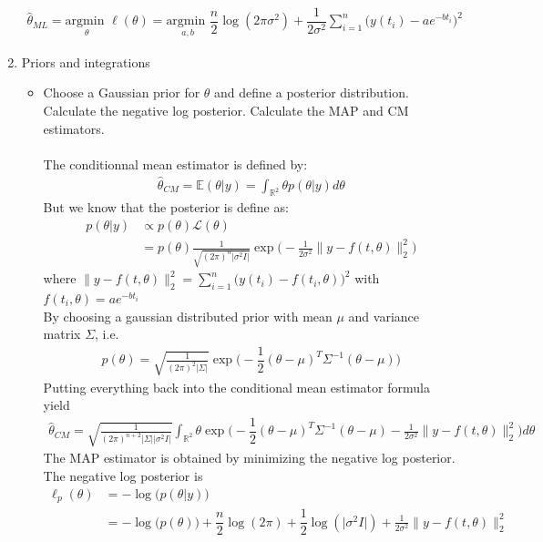 \documentclass[11pt,a4paper]{article}
\newcommand{\R}{\mathbb{R}}
\begin{document}
\begin{enumerate}
\begin{align*}
	\boxed{\hat{\theta}_{ML} = \underset{\theta}{\text{argmin }}\ell(\theta)=\underset{a,b}{\text{argmin }}\dfrac{n}{2}\log(2\pi\sigma^{2}) + \dfrac{1}{2\sigma^{2}}\sum_{i=1}^{n}\big(y(t_i)-ae^{-bt_i}\big)^{2}}
\end{align*}
\item Priors and integrations
\begin{itemize}
	\item Choose a Gaussian prior for $ \theta $ and define a posterior distribution.
	Calculate the negative log posterior. Calculate the MAP and CM estimators.\\\\
	
	The conditionnal mean estimator is defined by: \begin{align*}
		\hat{\theta}_{CM} = \mathbb{E}(\theta|y) = \int_{\R^2}\theta p(\theta|y)d\theta
	\end{align*}
But we know that the posterior is define as: \begin{align*}
	 p(\theta|y)& \propto p(\theta)\mathcal{L}(\theta)\\
	 & = p(\theta)\frac{1}{\sqrt{(2\pi)^n\lvert \sigma^2I\rvert}}\exp\big(-\frac{1}{2\sigma^2}\lVert y-f(t,\theta)\rVert_2^2\big)
\end{align*}
where $ \lVert y-f(t,\theta)\rVert_2^2 = \sum_{i=1}^{n}\big(y(t_i)-f(t_i,\theta)\big)^{2} $ with $ f(t_i,\theta) = ae^{-bt_i} $\\
By choosing a gaussian distributed prior with mean $ \mu $ and variance matrix $ \Sigma $, i.e.\begin{align*}
	p(\theta) = \sqrt{\frac{1}{(2\pi)^2\lvert\Sigma\rvert} }\exp\big(-\dfrac{1}{2}(\theta-\mu)^{T}\Sigma^{-1}(\theta-\mu)\big)
\end{align*}
Putting everything back into the conditional mean estimator formula yield
\begin{align*}
	\boxed{\hat{\theta}_{CM} =  \sqrt{\frac{1}{(2\pi)^{n+2}\lvert\Sigma\rvert\lvert\sigma^2I\rvert} }\int_{\R^2}\theta\exp\bigg(-\dfrac{1}{2}(\theta-\mu)^{T}\Sigma^{-1}(\theta-\mu)-\frac{1}{2\sigma^2}\lVert y-f(t,\theta)\rVert_2^2\bigg)d\theta}
\end{align*}
The MAP estimator is obtained by minimizing the negative log posterior.\\
The negative log posterior is 
\begin{align*}
	\ell_{p}(\theta) &= -\log\big(p(\theta|y)\big)\\
	& =-\log\big(p(\theta)\big)+\dfrac{n}{2}\log(2\pi)+ \dfrac{1}{2}\log(\lvert \sigma^{2}I\rvert)  + \frac{1}{2\sigma^2}\lVert y-f(t,\theta)\rVert_2^2

\end{align*}
\end{itemize}
\end{enumerate}
\end{document}
